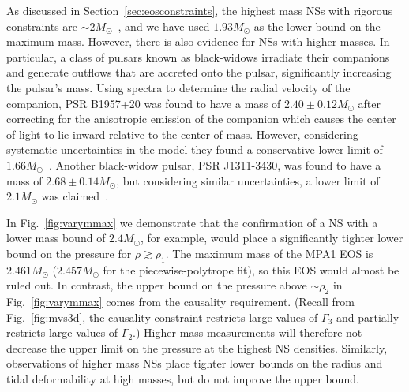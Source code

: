\documentclass[twocolumn,prd,amssymb,aps,nofootinbib,showpacs,epsf]{revtex4}
\begin{document}
As discussed in Section~\ref{sec:eosconstraints}, the highest mass NSs with rigorous constraints are $\sim 2M_\odot$~\cite{DemorestPennucciRansom2010, AntoniadisFreireWex2013}, and we have used $1.93M_\odot$ as the lower bound on the maximum mass. However, there is also evidence for NSs with higher masses. In particular, a class of pulsars known as black-widows irradiate their companions and generate outflows that are accreted onto the pulsar, significantly increasing the pulsar's mass. Using spectra to determine the radial velocity of the companion, PSR B1957+20 was found to have a mass of $2.40\pm0.12M_\odot$ after correcting for the anisotropic emission of the companion which causes the center of light to lie inward relative to the center of mass. However, considering systematic uncertainties in the model they found a conservative lower limit of $1.66M_\odot$~\cite{VanKerkwijkBretonKulkarni2011}. Another black-widow pulsar, PSR J1311-3430, was found to have a mass of $2.68\pm0.14M_\odot$, but considering similar uncertainties, a lower limit of $2.1M_\odot$ was claimed~\cite{RomaniFilippenkoSilverman2012}. 

In Fig.~\ref{fig:varymmax} we demonstrate that the confirmation of a NS with a lower mass bound of $2.4M_\odot$, for example, would place a significantly tighter lower bound on the pressure for $\rho \gtrsim \rho_1$. The maximum mass of the MPA1 EOS is $2.461M_\odot$ ($2.457M_\odot$ for the piecewise-polytrope fit), so this EOS would almost be ruled out. In contrast, the upper bound on the pressure above $\sim\rho_2$ in Fig.~\ref{fig:varymmax} comes from the causality requirement. (Recall from Fig.~\ref{fig:mvs3d}, the causality constraint restricts large values of $\Gamma_3$ and partially restricts large values of $\Gamma_2$.) Higher mass measurements will therefore not decrease the upper limit on the pressure at the highest NS densities. Similarly, observations of higher mass NSs place tighter lower bounds on the radius and tidal deformability at high masses, but do not improve the upper bound.
\end{document}
